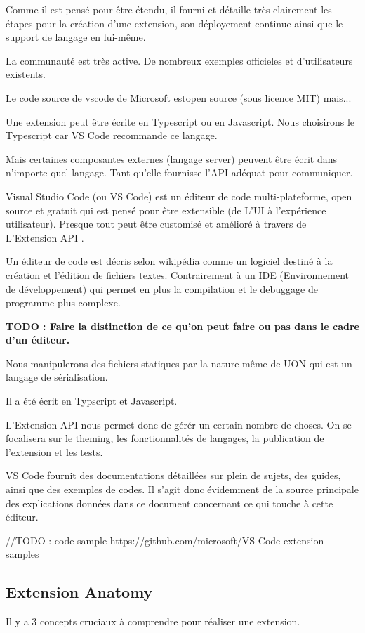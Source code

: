 \documentclass[
    iict, %
    il, %
]{heig-tb}
\begin{document}
Comme il est pensé pour être étendu, il fourni et détaille très clairement les étapes pour la création d'une extension, son déployement continue ainsi que le support de langage en lui-même.

La communauté est très active.
De nombreux exemples officieles et d'utilisateurs existents.

Le code source de vscode de Microsoft estopen source (sous licence MIT) mais...

Une extension peut être écrite en Typescript ou en Javascript.
Nous choisirons le Typescript car VS Code recommande ce langage.

Mais certaines composantes externes (langage server) peuvent être écrit dans n'importe quel langage. Tant qu'elle fournisse l'API adéquat pour communiquer.


Visual Studio Code (ou VS Code) est un éditeur de code multi-plateforme, open source et gratuit qui est pensé pour être extensible (de L'UI à l'expérience utilisateur).
Presque tout peut être customisé et amélioré à travers de L'Extension API \cite{extension-api}.


Un éditeur de code est décris selon wikipédia comme un logiciel destiné à la création et l'édition de fichiers textes.
Contrairement à un IDE (Environnement de développement) qui permet en plus la compilation et le debuggage de programme plus complexe.

\textbf{TODO : Faire la distinction de ce qu'on peut faire ou pas dans le cadre d'un éditeur.}

Nous manipulerons des fichiers statiques par la nature même de UON qui est un langage de sérialisation.

Il a été écrit en Typscript et Javascript.

L'Extension API nous permet donc de gérér un certain nombre de choses.
On se focalisera sur le theming, les fonctionnalités de langages, la publication de l'extension et les tests.

VS Code fournit des documentations détaillées sur plein de sujets, des guides, ainsi que des exemples de codes.
Il s'agit donc évidemment de la source principale des explications données dans ce document concernant ce qui touche à cette éditeur.

//TODO : code sample https://github.com/microsoft/VS Code-extension-samples

\subsection{Extension Anatomy}
Il y a 3 concepts cruciaux à comprendre pour réaliser une extension.
\end{document}
